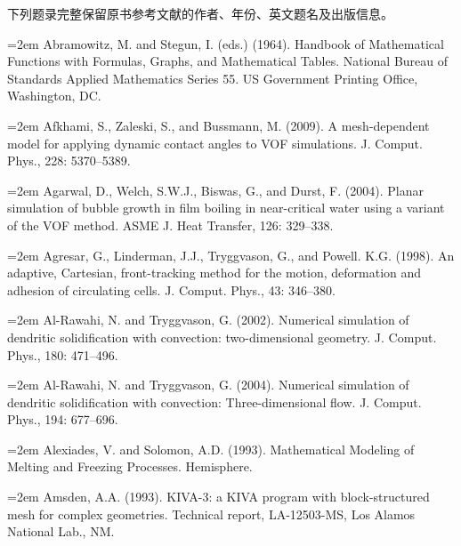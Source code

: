 \documentclass[11pt,a4paper,openany,fontset=none]{ctexbook}
\begin{document}


\begingroup\small

\setlength{\parindent}{0pt}

\setlength{\parskip}{0.45em}

下列题录完整保留原书参考文献的作者、年份、英文题名及出版信息。


\par\hangindent=2em Abramowitz, M. and Stegun, I. (eds.) (1964). Handbook of Mathematical Functions with Formulas, Graphs, and Mathematical Tables. National Bureau of Standards Applied Mathematics Series 55. US Government Printing Office, Washington, DC.

\par\hangindent=2em Afkhami, S., Zaleski, S., and Bussmann, M. (2009). A mesh-dependent model for applying dynamic contact angles to VOF simulations. J. Comput. Phys., 228: 5370--5389.

\par\hangindent=2em Agarwal, D., Welch, S.W.J., Biswas, G., and Durst, F. (2004). Planar simulation of bubble growth in film boiling in near-critical water using a variant of the VOF method. ASME J. Heat Transfer, 126: 329--338.

\par\hangindent=2em Agresar, G., Linderman, J.J., Tryggvason, G., and Powell. K.G. (1998). An adaptive, Cartesian, front-tracking method for the motion, deformation and adhesion of circulating cells. J. Comput. Phys., 43: 346--380.

\par\hangindent=2em Al-Rawahi, N. and Tryggvason, G. (2002). Numerical simulation of dendritic solidification with convection: two-dimensional geometry. J. Comput. Phys., 180: 471--496.

\par\hangindent=2em Al-Rawahi, N. and Tryggvason, G. (2004). Numerical simulation of dendritic solidification with convection: Three-dimensional flow. J. Comput. Phys., 194: 677--696.

\par\hangindent=2em Alexiades, V. and Solomon, A.D. (1993). Mathematical Modeling of Melting and Freezing Processes. Hemisphere.

\par\hangindent=2em Amsden, A.A. (1993). KIVA-3: a KIVA program with block-structured mesh for complex geometries. Technical report, LA-12503-MS, Los Alamos National Lab., NM.
\end{document}
